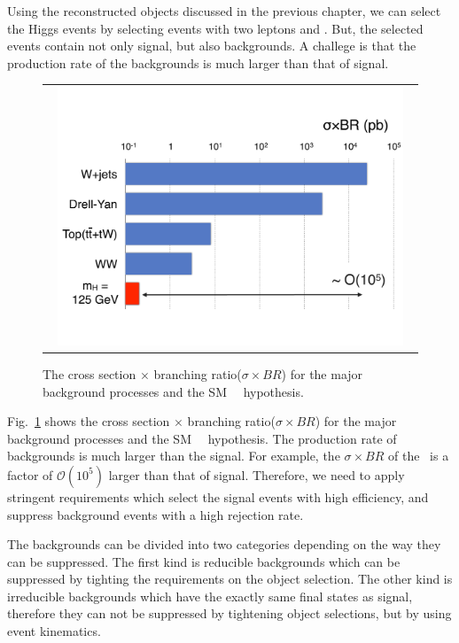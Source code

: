 Using the reconstructed objects discussed in the previous chapter, 
we can select the Higgs events by selecting events with two leptons 
and \met. But, the selected events contain not only signal, 
but also backgrounds. A challege is that the production rate 
of the backgrounds is much larger than that of signal. 
\begin{figure}[htp] 
\centering 
\begin{tabular}{c} 
\includegraphics[width=0.95\textwidth]{figures/BkgProdRate.pdf} 
\end{tabular} 
\caption{The cross section $\times$
branching ratio($\sigma \times BR$) for the major background
processes and the SM ~\GeV\ hypothesis.} 
\label{fig:bkgprodrate} 
\end{figure} 
Fig.~\ref{fig:bkgprodrate} shows the cross section $\times$ 
branching ratio($\sigma \times BR$) for the major background 
processes and the SM ~\GeV\ hypothesis. 
The production rate of backgrounds is much larger than the signal. 
For example, the $\sigma \times BR$ of the \Wjets\ is a factor of 
$\mathcal{O}(10^5)$ larger than that of signal.  
Therefore, we need to apply stringent requirements which 
select the signal events with high efficiency, and suppress 
background events with a high rejection rate.  

The backgrounds can be divided into two categories depending on 
the way they can be suppressed. The first kind is reducible 
backgrounds which can be suppressed by tighting the requirements 
on the object selection. The other kind is irreducible backgrounds 
which have the exactly same final states as signal, 
therefore they can not be suppressed by tightening object selections,  
but by using event kinematics. 

